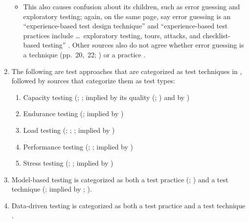 \begin{enumerate}
\begin{itemize}
                  \item This also causes confusion about its children, such as
                        error guessing and exploratory testing; again, on the
                        same page, \citeauthor{IEEE2022} say error guessing is
                        an ``experience-based test design technique'' and
                        ``experience-based test practices include \dots\
                        exploratory testing, tours, attacks, and
                        checklist-based testing'' \citeyearpar[p.~34]{IEEE2022}.
                        Other sources also do not agree whether error guessing
                        is a technique (pp.~20,~22; \citeyear[p.~viii]{IEEE2021})
                        or a practice \citep[p.~5-14]{SWEBOK2024}.
            \end{itemize}
      \item The following are test approaches that are categorized as test
            techniques in \citep[p.~38]{IEEE2021}, followed by sources that
            categorize them as test types:
            \begin{enumerate}
                  \item Capacity testing (\citealp[p.~22]{IEEE2022};
                        \citeyear[p.~2]{IEEE2013}; implied by its quality
                        (\citealp{ISO_IEC2023a}; \citealp[Tab.~A.1]{IEEE2021})
                        and by \citep[p.~53]{Firesmith2015})
                  \item Endurance testing (\citealp[p.~2]{IEEE2013};
                        implied by \citep[p.~55]{Firesmith2015})
                  \item Load testing (\citealp[pp.~5,~20,~22]{IEEE2022};
                        \citeyear[p.~253]{IEEE2017} \todo{OG IEEE 2013};
                        \citealpISTQB{}; implied by \citep[p.~54]{Firesmith2015})
                  \item Performance testing (\citealp[pp.~7,~22,~26-27]{IEEE2022};
                        \citeyear[p.~7]{IEEE2021}; implied by
                        \citep[p.~53]{Firesmith2015})
                  \item Stress testing (\citealp[pp.~9,~22]{IEEE2022};
                        \citeyear[p.~442]{IEEE2017}; implied by
                        \citep[p.~54]{Firesmith2015})
            \end{enumerate}
      \item Model-based testing is categorized as both a test practice
            (\citealp[p.~22]{IEEE2022}; \citeyear[p.~viii]{IEEE2021}) and
            a test technique (\citealp[p.~4]{Kam2008}; implied by
            \citealp[p.~7]{IEEE2021}; \citeyear[p.~469]{IEEE2017}).
      \item Data-driven testing is categorized as both a test practice
            \citep[p.~22]{IEEE2022} and a test technique
            \citep[p.~43]{Kam2008} .
\end{enumerate}


